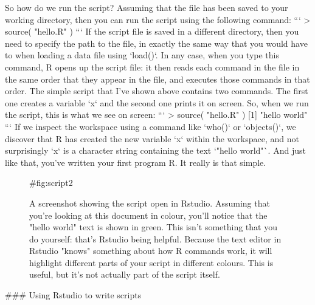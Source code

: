 So how do we run the script? Assuming that the  file has been saved to your working directory, then you can run the script using the following command:
```
> source( "hello.R" )
```
If the script file is saved in a different directory, then you need to specify the path to the file, in exactly the same way that you would have to when loading a data file using `load()`. In any case, when you type this command, R opens up the script file: it then reads each command in the file in the same order that they appear in the file, and executes those commands in that order. The simple script that I've shown above contains two commands. The first one creates a variable `x` and the second one prints it on screen. So, when we run the script, this is what we see on screen:
```
> source( "hello.R" )
[1] "hello world"
```
If we inspect the workspace using a command like `who()` or `objects()`, we discover that R has created the new variable `x` within the workspace, and not surprisingly `x` is a character string containing the text `"hello world"`. And just like that, you've written your first program R. It really is that simple. 



\begin{figure}[t]
\begin{center}
\caption{A screenshot showing the  script open in Rstudio. Assuming that you're looking at this document in colour, you'll notice that the "hello world" text is shown in green. This isn't something that you do yourself: that's Rstudio being helpful. Because the text editor in Rstudio "knows" something about how R commands work, it will highlight different parts of your script in different colours. This is useful, but it's not actually part of the script itself.}
{#fig:script2}
\HR
\end{center}
\end{figure}


### Using Rstudio to write scripts

